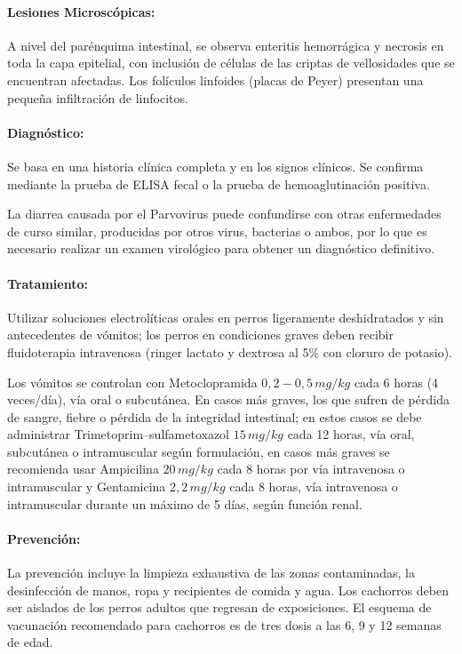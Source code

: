             \paragraph{Lesiones Microscópicas:} A nivel del parénquima intestinal, se observa enteritis hemorrágica y necrosis en toda la capa epitelial, con inclusión de células de las criptas de vellosidades que se encuentran afectadas. Los folículos linfoides (placas de Peyer) presentan una pequeña infiltración de linfocitos.

            \paragraph{Diagnóstico:} Se basa en una historia clínica completa y en los signos clínicos. Se confirma mediante la prueba de ELISA fecal o la prueba de hemoaglutinación positiva.

			La diarrea causada por el Parvovirus puede confundirse con otras enfermedades de curso similar, producidas por otros virus, bacterias o ambos, por lo que es necesario realizar un examen virológico para obtener un diagnóstico definitivo.

            \paragraph{Tratamiento:} Utilizar soluciones electrolíticas orales en perros ligeramente deshidratados y sin antecedentes de vómitos; los perros en condiciones graves deben recibir fluidoterapia intravenosa (ringer lactato y dextrosa al 5\% con cloruro de potasio).

            Los vómitos se controlan con Metoclopramida $0,2-0,5\,mg/kg$ cada 6 horas (4 veces/día), vía oral o subcutánea. En casos más graves, los que sufren de pérdida de sangre, fiebre o pérdida de la integridad intestinal; en estos casos se debe administrar Trimetoprim–sulfametoxazol $15\,mg/kg$ cada 12 horas, vía oral, subcutánea o intramuscular según formulación, en casos más graves se recomienda usar Ampicilina $20\,mg/kg$ cada 8 horas por vía intravenosa o intramuscular y Gentamicina $2,2\,mg/kg$ cada 8 horas, vía intravenosa o intramuscular durante un máximo de 5 días, según función renal.

            \paragraph{Prevención:} La prevención incluye la limpieza exhaustiva de las zonas contaminadas, la desinfección de manos, ropa y recipientes de comida y agua. Los cachorros deben ser aislados de los perros adultos que regresan de exposiciones. El esquema de vacunación recomendado para cachorros es de tres dosis a las 6, 9 y 12 semanas de edad. %

